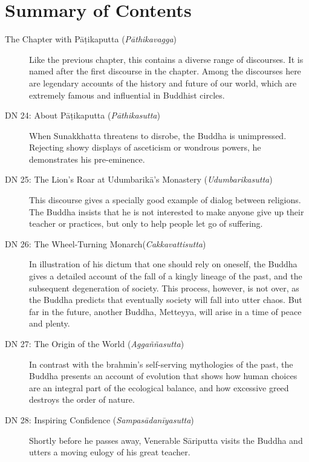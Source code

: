 \documentclass[12pt,openany]{book}%
\begin{document}
\newpage

\setlength{\parindent}{1.5em}%
\tableofcontents
\newpage
\pagestyle{fancy}
%
\chapter*{Summary of Contents}

\begin{description}%
\item[The Chapter with \textsanskrit{Pāṭikaputta} (\textit{\textsanskrit{Pāthikavagga}})] Like the previous chapter, this contains a diverse range of discourses. It is named after the first discourse in the chapter. Among the discourses here are legendary accounts of the history and future of our world, which are extremely famous and influential in Buddhist circles.%
\item[DN 24: About \textsanskrit{Pāṭikaputta} (\textit{\textsanskrit{Pāthikasutta}})] When Sunakkhatta threatens to disrobe, the Buddha is unimpressed. Rejecting showy displays of asceticism or wondrous powers, he demonstrates his pre-eminence.%
\item[DN 25: The Lion’s Roar at \textsanskrit{Udumbarikā}’s Monastery (\textit{\textsanskrit{Udumbarikasutta}})] This discourse gives a specially good example of dialog between religions. The Buddha insists that he is not interested to make anyone give up their teacher or practices, but only to help people let go of suffering.%
\item[DN 26: The Wheel-Turning Monarch(\textit{\textsanskrit{Cakkavattisutta}})] In illustration of his dictum that one should rely on oneself, the Buddha gives a detailed account of the fall of a kingly lineage of the past, and the subsequent degeneration of society. This process, however, is not over, as the Buddha predicts that eventually society will fall into utter chaos. But far in the future, another Buddha, Metteyya, will arise in a time of peace and plenty.%
\item[DN 27: The Origin of the World (\textit{\textsanskrit{Aggaññasutta}})] In contrast with the brahmin’s self-serving mythologies of the past, the Buddha presents an account of evolution that shows how human choices are an integral part of the ecological balance, and how excessive greed destroys the order of nature.%
\item[DN 28: Inspiring Confidence (\textit{\textsanskrit{Sampasādanīyasutta}})] Shortly before he passes away, Venerable \textsanskrit{Sāriputta} visits the Buddha and utters a moving eulogy of his great teacher.%

\end{description}
\end{document}
